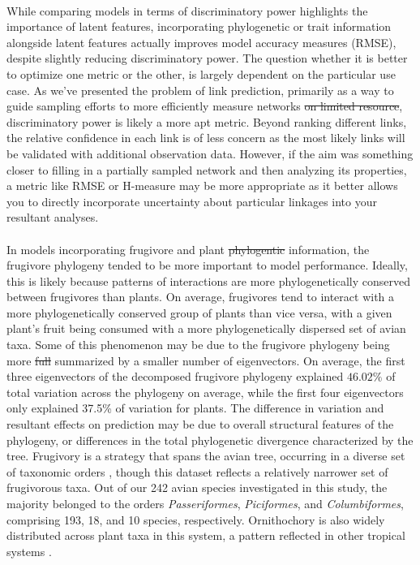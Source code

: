 \documentclass[num-refs]{article}%
\providecommand{\DIFadd}[1]{{\protect\color{blue}\uwave{#1}}} %
\providecommand{\DIFdel}[1]{{\protect\color{red}\sout{#1}}}                      %
\providecommand{\DIFaddbegin}{} %
\providecommand{\DIFaddend}{} %
\providecommand{\DIFdelbegin}{} %
\providecommand{\DIFdelend}{} %
\newcommand{\DIFscaledelfig}{0.5}
\newlength{\DIFdelgraphicswidth} %
\newlength{\DIFdelgraphicsheight} %
\newcommand{\DIFaddincludegraphics}[2][]{{\color{blue}\fbox{\DIFOincludegraphics[#1]{#2}}}} %
\newcommand{\DIFdelincludegraphics}[2][]{%
\sbox{\DIFdelgraphicsbox}{\DIFOincludegraphics[#1]{#2}}%
\settoboxwidth{\DIFdelgraphicswidth}{\DIFdelgraphicsbox} %
\settoboxtotalheight{\DIFdelgraphicsheight}{\DIFdelgraphicsbox} %
\scalebox{\DIFscaledelfig}{%
\parbox[b]{\DIFdelgraphicswidth}{\usebox{\DIFdelgraphicsbox}\\[-\baselineskip] \rule{\DIFdelgraphicswidth}{0em}}\llap{\resizebox{\DIFdelgraphicswidth}{\DIFdelgraphicsheight}{%
\setlength{\unitlength}{\DIFdelgraphicswidth}%
\begin{picture}(1,1)%
\thicklines\linethickness{2pt} %
{\color[rgb]{1,0,0}\put(0,0){\framebox(1,1){}}}%
{\color[rgb]{1,0,0}\put(0,0){\line( 1,1){1}}}%
{\color[rgb]{1,0,0}\put(0,1){\line(1,-1){1}}}%
\end{picture}%
}\hspace*{3pt}}} %
} %
\DeclareRobustCommand{\DIFaddbegin}{\DIFOaddbegin \let\includegraphics\DIFaddincludegraphics} %
\DeclareRobustCommand{\DIFaddend}{\DIFOaddend \let\includegraphics\DIFOincludegraphics} %
\DeclareRobustCommand{\DIFdelbegin}{\DIFOdelbegin \let\includegraphics\DIFdelincludegraphics} %
\DeclareRobustCommand{\DIFdelend}{\DIFOaddend \let\includegraphics\DIFOincludegraphics} %
\begin{document}
\paragraph*{} 
While comparing models in terms of discriminatory power highlights the importance of latent features, incorporating phylogenetic or trait information alongside latent features actually improves model accuracy measures (RMSE), despite slightly reducing discriminatory power. The question whether it is better to optimize one metric or the other, is largely dependent on the particular use case. As we've presented the problem of link prediction, primarily as a way to guide sampling efforts to more efficiently measure networks \DIFdelbegin \DIFdel{on limited resource}\DIFdelend \DIFaddbegin \DIFadd{given limited resources}\DIFaddend , discriminatory power is likely a more apt metric. Beyond ranking different links, the relative confidence in each link is of less concern as the most likely links will be validated with additional observation data. However, if the aim was something closer to filling in a partially sampled network and then analyzing its properties, a metric like RMSE or H-measure\citep{hand2009measuring} may be more appropriate as it better allows you to directly incorporate uncertainty about particular linkages into your resultant analyses. 


\paragraph*{} In models incorporating frugivore and plant \DIFdelbegin \DIFdel{phylogentic }\DIFdelend \DIFaddbegin \DIFadd{phylogenetic }\DIFaddend information, the frugivore phylogeny tended to be more important to model performance. Ideally, this is likely because patterns of interactions are more phylogenetically conserved between frugivores than plants. On average, frugivores tend to interact with a more phylogenetically conserved group of plants than vice versa, with a given plant's fruit being consumed with a more phylogenetically dispersed set of avian taxa. Some of this phenomenon may be due to the frugivore phylogeny being more \DIFdelbegin \DIFdel{full }\DIFdelend \DIFaddbegin \DIFadd{fully }\DIFaddend summarized by a smaller number of eigenvectors. On average, the first three eigenvectors of the decomposed frugivore phylogeny explained $46.02\%$ of total variation across the phylogeny on average, while the first four eigenvectors only explained 37.5\% of variation for plants. The difference in variation and resultant effects on prediction may be due to overall structural features of the phylogeny, or differences in the total phylogenetic divergence characterized by the tree. Frugivory is a strategy that spans the avian tree, occurring in a diverse set of taxonomic orders \citep{daniel2009global}, though this dataset reflects a relatively narrower set of frugivorous taxa. Out of our 242 avian species investigated in this study, the majority belonged to the orders \textit{Passeriformes}, \textit{Piciformes}, and \textit{Columbiformes}, comprising 193, 18, and 10 species, respectively. Ornithochory is also widely distributed across plant taxa in this system, a pattern reflected in other tropical systems \citep{kuhlmann2016fruits, pizo2021frugivory}. 
\end{document}
